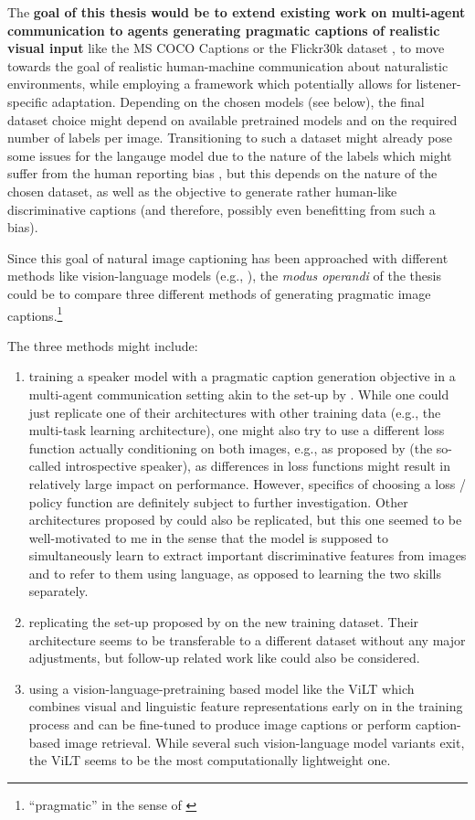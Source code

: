 \documentclass[11pt,letterpaper]{article}
\begin{document}
The \textbf{goal of this thesis would be to extend existing work on multi-agent communication to agents generating pragmatic captions of realistic visual input} like the MS COCO Captions or the Flickr30k dataset \cite{lin2014microsoft, young2014image}, to move towards the goal of realistic human-machine communication about naturalistic environments, while employing a framework which potentially allows for listener-specific adaptation. Depending on the chosen models (see below), the final dataset choice might depend on available pretrained models and on the required number of labels per image. Transitioning to such a dataset might already pose some issues for the langauge model due to the nature of the labels which might suffer from the human reporting bias \cite{misra2016seeing}, but this depends on the nature of the chosen dataset, as well as the objective to generate rather human-like discriminative captions (and therefore, possibly even benefitting from such a bias).

Since this goal of natural image captioning has been approached with different methods like vision-language models (e.g., \cite{kim2021vilt}), the \textit{modus operandi} of the thesis could be to compare three different methods of generating pragmatic image captions.\footnote{``pragmatic'' in the sense of \cite{andreas2016reasoning}}

The three methods might include: 
\begin{enumerate}
	\item  training a speaker model with a pragmatic caption generation objective in a multi-agent communication setting akin to the set-up by \cite{lazaridou2020multi}. While one could just replicate one of their architectures with other training data (e.g., the multi-task learning architecture), one might also try to use a different loss function actually conditioning on both images, e.g., as proposed by \cite{vedantam2017context} (the so-called introspective speaker), as differences in loss functions might result in relatively large impact on performance. However, specifics of choosing a loss / policy function are definitely subject to further investigation. Other architectures proposed by \cite{lazaridou2020multi} could also be replicated, but this one seemed to be well-motivated to me in the sense that the model is supposed to simultaneously learn to extract important discriminative features from images and to refer to them using language, as opposed to learning the two skills separately.
	\item replicating the set-up proposed by \cite{andreas2016reasoning} on the new training dataset. Their architecture seems to be transferable to a different dataset without any major adjustments, but follow-up related work like \cite{nie2020pragmatic} could also be considered. 
	\item using a vision-language-pretraining based model like the ViLT \cite{kim2021vilt} which combines visual and linguistic feature representations early on in the training process and can be fine-tuned to produce image captions or perform caption-based image retrieval. While several such vision-language model variants exit, the ViLT seems to be the most computationally lightweight one.  
\end{enumerate}
\end{document}
